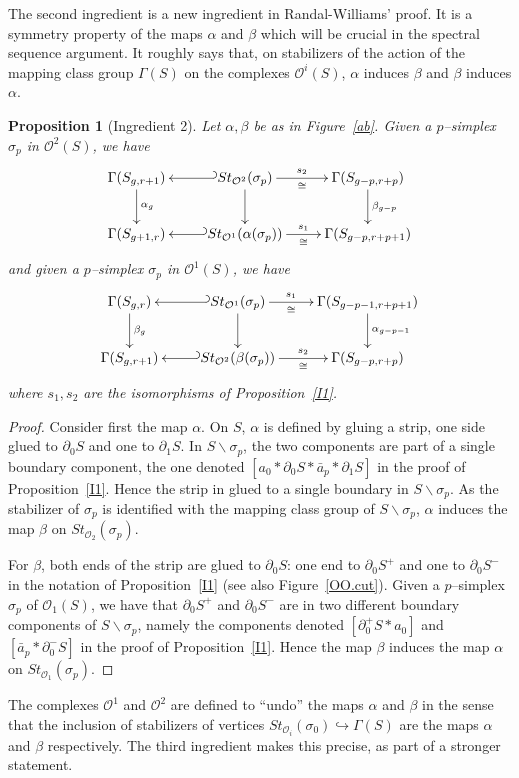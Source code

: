\documentclass[10pt]{amsart}
\newtheorem{prop}[thm]{Proposition}
\newcommand{\OO}{\mathcal{O}}
\newcommand{\al}{\alpha}
\newcommand{\be}{\beta}
\newcommand{\Ga}{\Gamma}
\newcommand{\s}{\sigma}
\newcommand{\inc}{\hookrightarrow}
\newcommand{\minus}{\backslash}
\newcommand{\del}{\partial}
\begin{document}
The second ingredient is a new ingredient in Randal-Williams' proof. It is a symmetry property of the maps $\al$ and
$\be$ which will be crucial in
the spectral sequence argument. It roughly says that, on stabilizers of the action of the mapping class group $\Ga(S)$ on the complexes
$\OO^i(S)$, 
$\al$ induces $\beta$ and $\beta$ induces $\al$.


\begin{prop}[Ingredient 2]\label{I2}
Let $\al,\beta$ be as in Figure~\ref{ab}. Given a $p$--simplex $\s_p$ in
$\OO^2(S)$, we have
$$\xymatrix{\Ga(S_{g,r+1})\ar[d]^{\al_g} & \ar@{_(->}[l] St_{\OO^2}(\s_p) \ar[r]^-{s_2}_-\cong \ar[d] & \Ga(S_{g-p,r+p}) \ar[d]^-{\beta_{g-p}} \\
\Ga(S_{g+1,r}) &  \ar@{_(->}[l] St_{\OO^1}(\al(\s_p)) \ar[r]^-{s_1}_-\cong & \Ga(S_{g-p,r+p+1}) }$$
and given  a $p$--simplex $\s_p$ in $\OO^1(S)$, we have
$$\xymatrix{\Ga(S_{g,r})\ar[d]^{\be_g} & \ar@{_(->}[l] St_{\OO^1}(\s_p) \ar[r]^-{s_1}_-\cong \ar[d] & \Ga(S_{g-p-1,r+p+1}) \ar[d]^-{\al_{g-p-1}} \\
\Ga(S_{g,r+1}) &  \ar@{_(->}[l] St_{\OO^2}(\be(\s_p)) \ar[r]^-{s_2}_-\cong & \Ga(S_{g-p,r+p}) }$$
where $s_1,s_2$ are the isomorphisms of Proposition~\ref{I1}. 
\end{prop}


\begin{proof}
Consider first the map $\al$. On $S$, $\al$ is defined by gluing a strip, one side glued to $\del_0S$ and one to $\del_1S$. In 
$S\minus\s_p$, the two components are part of a single boundary component, the one denoted $[a_0*\del_0S*\bar a_p*\del_1S]$ in the proof of
Proposition~\ref{I1}. Hence the strip in glued to a single boundary in $S\minus\s_p$. As the stabilizer of $\s_p$ is identified with 
the mapping class
group of $S\minus\s_p$, $\al$ induces the map $\beta$ on $St_{\OO_2}(\s_p)$.

For $\beta$, both ends of the strip are glued to $\del_0S$: one end to $\del_0S^+$ and one to $\del_0S^-$ in the notation of
Proposition~\ref{I1} (see also Figure~\ref{OO.cut}). Given a $p$--simplex $\s_p$ of
$\OO_1(S)$, we have that $\del_0S^+$ and $\del_0S^-$ are in two different boundary components of $S\minus\s_p$, namely the components
denoted   $[\del_0^+\!S*a_0]$ and $[\bar a_p*\del_0^-\!S]$ in the proof of Proposition~\ref{I1}. 
Hence the map $\beta$ induces the map $\al$ on
$St_{\OO_1}(\s_p)$.  
\end{proof}


The complexes $\OO^1$ and $\OO^2$ are defined to ``undo'' the maps $\al$ and $\beta$ in the sense that the inclusion of stabilizers of
vertices $St_{\OO_i}(\s_0)\inc \Ga(S)$ are the maps $\al$ and $\beta$ respectively. The third ingredient makes this precise, as part of
a stronger statement. 
\end{document}
